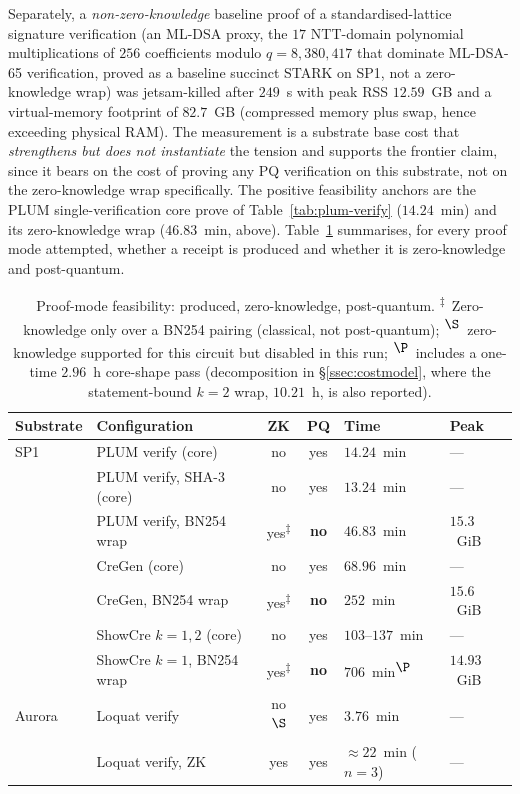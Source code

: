 Separately, a \emph{non-zero-knowledge} baseline proof of a standardised-lattice signature verification (an ML-DSA proxy, the $17$ NTT-domain polynomial multiplications of $256$ coefficients modulo $q=8{,}380{,}417$ that dominate ML-DSA-65 verification, proved as a baseline succinct STARK on SP1, not a zero-knowledge wrap) was jetsam-killed after $249$~s with peak RSS $12.59$~GB and a virtual-memory footprint of $82.7$~GB (compressed memory plus swap, hence exceeding physical RAM). The measurement is a substrate base cost that \emph{strengthens but does not instantiate} the tension and supports the frontier claim, since it bears on the cost of proving any PQ verification on this substrate, not on the zero-knowledge wrap specifically. The positive feasibility anchors are the PLUM single-verification core prove of Table~\ref{tab:plum-verify} ($14.24$~min) and its zero-knowledge wrap ($46.83$~min, above). Table~\ref{tab:proof-mode} summarises, for every proof mode attempted, whether a receipt is produced and whether it is zero-knowledge and post-quantum.

\begin{table}[H]
\centering
\small
\renewcommand{\arraystretch}{1.2}
\begin{tabular}{@{}llccll@{}}
\toprule
Substrate & Configuration & ZK & PQ & Time & Peak \\
\midrule
SP1 & PLUM verify (core) & no & yes & $14.24$~min & --- \\
 & PLUM verify, SHA-3 (core) & no & yes & $13.24$~min & --- \\
 & PLUM verify, BN254 wrap & yes\textsuperscript{$\ddagger$} & \textbf{no} & $46.83$~min & $15.3$~GiB \\
 & CreGen (core) & no & yes & $68.96$~min & --- \\
 & CreGen, BN254 wrap & yes\textsuperscript{$\ddagger$} & \textbf{no} & $252$~min & $15.6$~GiB \\
 & ShowCre $k{=}1,2$ (core) & no & yes & $103$--$137$~min & --- \\
 & ShowCre $k{=}1$, BN254 wrap & yes\textsuperscript{$\ddagger$} & \textbf{no} & $706$~min\textsuperscript{$\P$} & $14.93$~GiB \\
Aurora & Loquat verify & no\textsuperscript{$\S$} & yes & $3.76$~min & --- \\
 & Loquat verify, ZK & yes & yes & ${\approx}22$~min ($n{=}3$) & --- \\
\bottomrule
\end{tabular}
\caption{Proof-mode feasibility: produced, zero-knowledge, post-quantum. \textsuperscript{$\ddagger$}~Zero-knowledge only over a {BN254} pairing (classical, not post-quantum); \textsuperscript{$\S$}~zero-knowledge supported for this circuit but disabled in this run; \textsuperscript{$\P$}~includes a one-time $2.96$~h core-shape pass (decomposition in \S\ref{ssec:costmodel}, where the statement-bound $k{=}2$ wrap, $10.21$~h, is also reported).}
\label{tab:proof-mode}
\end{table}

